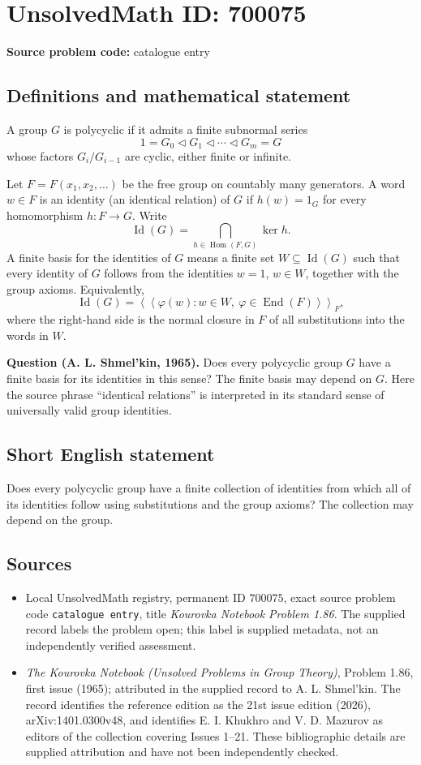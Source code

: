 \documentclass[11pt]{article}
\begin{document}
\section*{UnsolvedMath ID: 700075}
\textbf{Source problem code:} catalogue entry
\subsection{Definitions and mathematical statement}
A group \(G\) is polycyclic if it admits a finite subnormal series
\[
1=G_0\triangleleft G_1\triangleleft\cdots\triangleleft G_m=G
\]
whose factors \(G_i/G_{i-1}\) are cyclic, either finite or infinite.

Let \(F=F(x_1,x_2,\ldots)\) be the free group on countably many generators. A word \(w\in F\) is an identity (an identical relation) of \(G\) if \(h(w)=1_G\) for every homomorphism \(h:F\to G\). Write
\[
\operatorname{Id}(G)=\bigcap_{h\in\operatorname{Hom}(F,G)}\ker h.
\]
A finite basis for the identities of \(G\) means a finite set \(W\subseteq\operatorname{Id}(G)\) such that every identity of \(G\) follows from the identities \(w=1\), \(w\in W\), together with the group axioms. Equivalently,
\[
\operatorname{Id}(G)=
\left\langle\!\left\langle
\varphi(w):w\in W,\ \varphi\in\operatorname{End}(F)
\right\rangle\!\right\rangle_F,
\]
where the right-hand side is the normal closure in \(F\) of all substitutions into the words in \(W\).

\textbf{Question (A. L. Shmel'kin, 1965).} Does every polycyclic group \(G\) have a finite basis for its identities in this sense? The finite basis may depend on \(G\). Here the source phrase ``identical relations'' is interpreted in its standard sense of universally valid group identities.
\subsection{Short English statement}
Does every polycyclic group have a finite collection of identities from which all of its identities follow using substitutions and the group axioms? The collection may depend on the group.
\subsection{Sources}
\begin{itemize}
\item Local UnsolvedMath registry, permanent ID \(700075\), exact source problem code \texttt{catalogue entry}, title \emph{Kourovka Notebook Problem 1.86}. The supplied record labels the problem open; this label is supplied metadata, not an independently verified assessment.
\item \emph{The Kourovka Notebook (Unsolved Problems in Group Theory)}, Problem 1.86, first issue (1965); attributed in the supplied record to A. L. Shmel'kin. The record identifies the reference edition as the 21st issue edition (2026), arXiv:1401.0300v48, and identifies E. I. Khukhro and V. D. Mazurov as editors of the collection covering Issues 1--21. These bibliographic details are supplied attribution and have not been independently checked.
\end{itemize}
\end{document}
